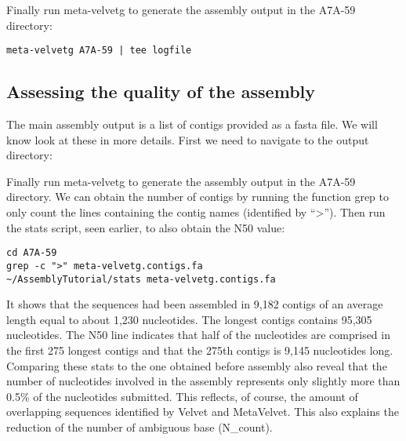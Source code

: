 \begin{steps}
Finally run meta-velvetg to generate the assembly output in the A7A-59 directory:
\begin{lstlisting}
meta-velvetg A7A-59 | tee logfile 
\end{lstlisting}
\end{steps}

\subsection{Assessing the quality of the assembly}
The main assembly output is a list of contigs provided as a fasta file. We will know look at these in more details. First we need to navigate to the output directory:

\begin{steps}
Finally run meta-velvetg to generate the assembly output in the A7A-59 directory. We can obtain the number of contigs by running the function grep to only count the lines containing the contig names (identified by “>”). Then run the stats script, seen earlier, to also obtain the N50 value:
\begin{lstlisting}
cd A7A-59
grep -c ">" meta-velvetg.contigs.fa
~/AssemblyTutorial/stats meta-velvetg.contigs.fa
\end{lstlisting}
\end{steps}

It shows that the sequences had been assembled in 9,182 contigs of an average length equal to about 1,230 nucleotides. The longest contigs contains 95,305 nucleotides. The N50 line indicates that half of the nucleotides are comprised in the first 275 longest contigs and that the 275th contigs is 9,145 nucleotides long.
Comparing these stats to the one obtained before assembly also reveal that the number of nucleotides involved in the assembly represents only slightly more than 0.5\% of the nucleotides submitted. This reflects, of course, the amount of overlapping sequences identified by Velvet and MetaVelvet. This also explains the reduction of the number of ambiguous base (N\_count).

